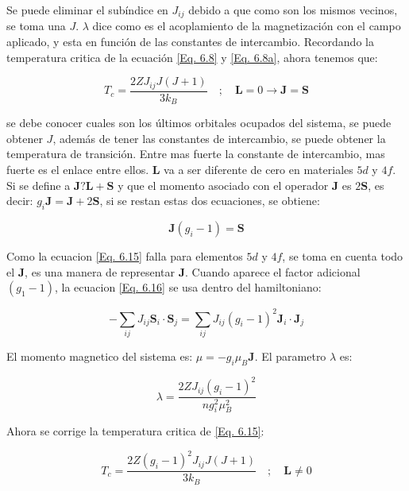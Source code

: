 \documentclass[11pt,fleqn]{book}
\renewcommand{\vec}[1]{\mathbf{#1}}
\begin{document}
Se puede eliminar el subíndice en $J_{ij}$ debido a que como son los mismos vecinos, se toma una $J$. $\lambda$ dice como es el acoplamiento de la magnetización con el campo aplicado, y esta en función de las constantes de intercambio. Recordando la temperatura critica de la ecuación \ref{Eq. 6.8} y \ref{Eq. 6.8a}, ahora tenemos que:

\begin{equation}
    T_{c}=\frac{2ZJ_{ij}J(J+1)}{3k_{B}}\quad;\quad\vec{L}=0\longrightarrow\vec{J}=\vec{S}
    \label{Eq. 6.15}
\end{equation}

se debe conocer cuales son los últimos orbitales ocupados del sistema, se puede obtener $J$, además de tener las constantes de intercambio, se puede obtener la temperatura de transición. Entre mas fuerte la constante de intercambio, mas fuerte es el enlace entre ellos. $\vec{L}$ va a ser diferente de cero en materiales $5d$ y $4f$. Si se define a $\vec{J}?\vec{L}+\vec{S}$ y que el momento asociado con el operador $\vec{J}$ es $2\vec{S}$, es decir: $g_{i}\vec{J}=\vec{J}+2\vec{S}$, si se restan estas dos ecuaciones, se obtiene:

\begin{equation}
    \vec{J}(g_{i}-1)=\vec{S}
    \label{Eq. 6.16}
\end{equation}

Como la ecuacion \ref{Eq. 6.15} falla para elementos $5d$ y $4f$, se toma en cuenta todo el $\vec{J}$, es una manera de representar $\vec{J}$. Cuando aparece el factor adicional $(g_{1}-1)$, la ecuacion \ref{Eq. 6.16} se usa dentro del hamiltoniano:

\begin{equation}
    -\sum_{ij}J_{ij}\vec{S}_{i}\cdot\vec{S}_{j}=\sum_{ij}J_{ij}(g_{i}-1)^{2}\vec{J}_{i}\cdot\vec{J}_{j}
    \label{Eq. 6.17}
\end{equation}

El momento magnetico del sistema es: $\mu=-g_{i}\mu_{B}\vec{J}$. El parametro $\lambda$ es:

\begin{equation}
   \lambda=\frac{2ZJ_{ij}(g_{i}-1)^{2}}{ng_{i}^{2}\mu_{B}^{2}}
    \label{Eq. 6.18}   
\end{equation}

Ahora se corrige la temperatura critica de \ref{Eq. 6.15}:


\begin{equation}
    T_{c}=\frac{2Z(g_{i}-1)^{2}J_{ij}J(J+1)}{3k_{B}}\quad;\quad\vec{L}\neq0
    \label{Eq. 6.20}
\end{equation}
\end{document}
